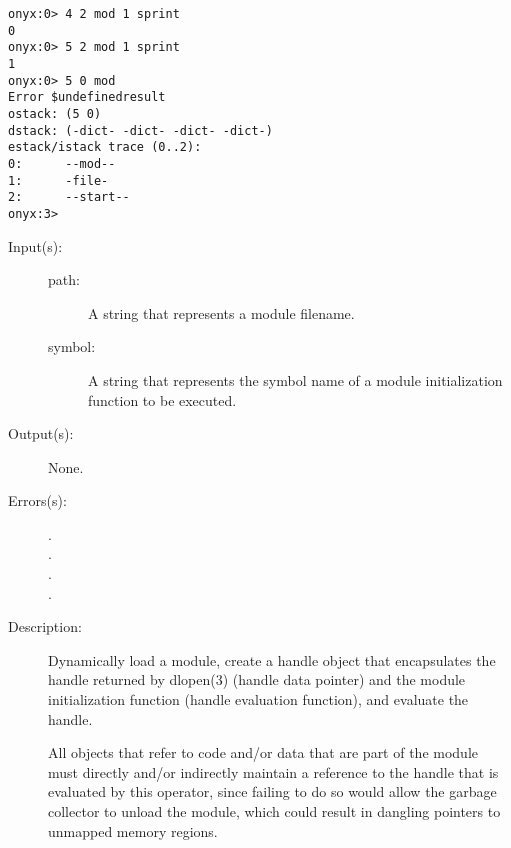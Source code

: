 \begin{description}
\begin{description}
\begin{verbatim}
onyx:0> 4 2 mod 1 sprint
0
onyx:0> 5 2 mod 1 sprint
1
onyx:0> 5 0 mod
Error $undefinedresult
ostack: (5 0)
dstack: (-dict- -dict- -dict- -dict-)
estack/istack trace (0..2):
0:      --mod--
1:      -file-
2:      --start--
onyx:3>
		\end{verbatim}
	\end{description}
\label{systemdict:modload}
\item[{\onyxop{path symbol}{modload}{--}}: ]
	\begin{description}\item[]
	\item[Input(s): ]
		\begin{description}\item[]
		\item[path: ]
			A string that represents a module filename.
		\item[symbol: ]
			A string that represents the symbol name of a
			module initialization function to be executed.
		\end{description}
	\item[Output(s): ] None.
	\item[Errors(s): ]
		\begin{description}\item[]
		\item[.]
		\item[.]
		\item[.]
		\item[.]
		\end{description}
	\item[Description: ]
		Dynamically load a module, create a handle object that
		encapsulates the handle returned by dlopen(3) (handle data
		pointer) and the module initialization function (handle
		evaluation function), and evaluate the handle.

		All objects that refer to code and/or data that are part of the
		module must directly and/or indirectly maintain a reference to
		the handle that is evaluated by this operator, since failing to
		do so would allow the garbage collector to unload the module,
		which could result in dangling pointers to unmapped memory
		regions.


\end{description}
\end{description}
